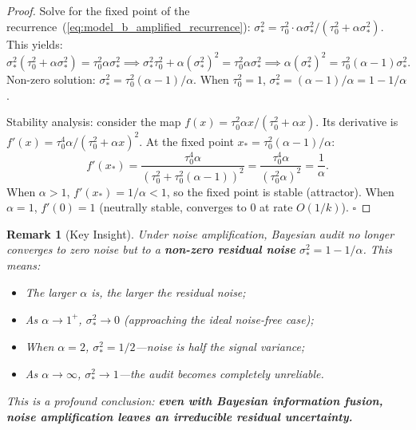 \documentclass[12pt,a4paper]{article}
\newtheorem{remark}[theorem]{Remark}
\theoremstyle{definition}
\begin{document}
\begin{proof}
Solve for the fixed point of the recurrence~(\ref{eq:model_b_amplified_recurrence}): $\sigma_*^2 = \tau_0^2 \cdot \alpha \sigma_*^2 / (\tau_0^2 + \alpha \sigma_*^2)$. This yields:
\begin{equation*}
    \sigma_*^2(\tau_0^2 + \alpha \sigma_*^2) = \tau_0^2 \alpha \sigma_*^2 \implies \sigma_*^2 \tau_0^2 + \alpha (\sigma_*^2)^2 = \tau_0^2 \alpha \sigma_*^2 \implies \alpha (\sigma_*^2)^2 = \tau_0^2 (\alpha - 1) \sigma_*^2.
\end{equation*}
Non-zero solution: $\sigma_*^2 = \tau_0^2 (\alpha - 1) / \alpha$. When $\tau_0^2 = 1$, $\sigma_*^2 = (\alpha - 1)/\alpha = 1 - 1/\alpha$.

Stability analysis: consider the map $f(x) = \tau_0^2 \alpha x / (\tau_0^2 + \alpha x)$. Its derivative is $f'(x) = \tau_0^4 \alpha / (\tau_0^2 + \alpha x)^2$. At the fixed point $x_* = \tau_0^2(\alpha-1)/\alpha$:
\begin{equation*}
    f'(x_*) = \frac{\tau_0^4 \alpha}{(\tau_0^2 + \tau_0^2(\alpha-1))^2} = \frac{\tau_0^4 \alpha}{(\tau_0^2 \alpha)^2} = \frac{1}{\alpha}.
\end{equation*}
When $\alpha > 1$, $f'(x_*) = 1/\alpha < 1$, so the fixed point is stable (attractor). When $\alpha = 1$, $f'(0) = 1$ (neutrally stable, converges to $0$ at rate $O(1/k)$). \hfill$\square$
\end{proof}

\begin{remark}[Key Insight]
Under noise amplification, Bayesian audit no longer converges to zero noise but to a \textbf{non-zero residual noise} $\sigma_*^2 = 1 - 1/\alpha$. This means:
\begin{itemize}
    \item The larger $\alpha$ is, the larger the residual noise;
    \item As $\alpha \to 1^+$, $\sigma_*^2 \to 0$ (approaching the ideal noise-free case);
    \item When $\alpha = 2$, $\sigma_*^2 = 1/2$---noise is half the signal variance;
    \item As $\alpha \to \infty$, $\sigma_*^2 \to 1$---the audit becomes completely unreliable.
\end{itemize}
This is a profound conclusion: \textbf{even with Bayesian information fusion, noise amplification leaves an irreducible residual uncertainty.}
\end{remark}

\end{document}
